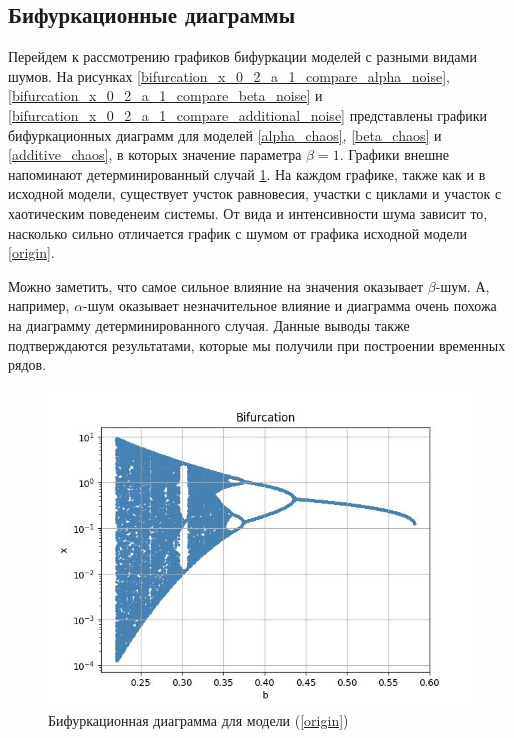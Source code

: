 \subsection{Бифуркационные диаграммы}

    Перейдем к рассмотрению графиков бифуркации моделей с разными видами шумов. На рисунках \ref{bifurcation_x_0_2_a_1_compare_alpha_noise}, \ref{bifurcation_x_0_2_a_1_compare_beta_noise} и \ref{bifurcation_x_0_2_a_1_compare_additional_noise} представлены графики бифуркационных диаграмм для моделей \ref{alpha_chaos}, \ref{beta_chaos} и \ref{additive_chaos}, в которых значение параметра \(\beta = 1\). Графики внешне напоминают детерминированный случай \ref{bifurcation_x_0_2_a_1_compare_no_noise}. На каждом графике, также как и в исходной модели, существует учсток равновесия, участки с циклами и участок с хаотическим поведенеим системы. От вида и интенсивности шума зависит то, насколько сильно отличается график с шумом от графика исходной модели \ref{origin}. 

    Можно заметить, что самое сильное влияние на значения оказывает \(\beta\)-шум. А, например, \(\alpha\)-шум оказывает незначительное влияние и диаграмма очень похожа на диаграмму детерминированного случая. Данные выводы также подтверждаются результатами, которые мы получили при построении временных рядов.

    \begin{figure}
        \centering
        \includegraphics[width=\textwidth]{stochastic/images/bifurcation_x_0_2_a_1_compare_no_noise.jpg}
        
        \captionsetup{justification=centering}
        \caption{Бифуркационная диаграмма для модели (\ref{origin})}
        \label{bifurcation_x_0_2_a_1_compare_no_noise}
    \end{figure}

